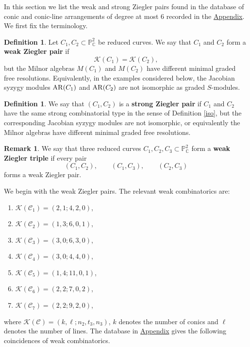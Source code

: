 \documentclass[11pt]{article}
\theoremstyle{plain}
\theoremstyle{definition}
\newtheorem{definition}[thm]{Definition}
\newtheorem{remark}[thm]{Remark}
\begin{document}
In this section we list the weak and strong Ziegler pairs found in the database of conic and conic-line arrangements of degree at most $6$ recorded in the \hyperref[sec:data]{Appendix}. We first fix the terminology.

\begin{definition}
Let $C_1,C_2\subset\mathbb P^2_{\mathbb C}$ be reduced curves. We say that $C_1$ and $C_2$ form a \textbf{weak Ziegler pair} if
\[
\mathcal K(C_1)=\mathcal K(C_2),
\]
but the Milnor algebras $M(C_1)$ and $M(C_2)$ have different minimal graded free resolutions. Equivalently, in the examples considered below, the Jacobian syzygy modules ${\rm AR}(C_1)$ and ${\rm AR}(C_2)$ are not isomorphic as graded $S$-modules.
\end{definition}

\begin{definition}
We say that \((C_1,C_2)\) is a \textbf{strong Ziegler pair} if \(C_1\) and
\(C_2\) have the same strong combinatorial type in the sense of
Definition \ref{iso}, but the corresponding Jacobian syzygy modules are not
isomorphic, or equivalently the Milnor algebras have different minimal
graded free resolutions.
\end{definition}

\begin{remark}
    We say that three reduced curves \(C_1,C_2, C_3\subset\mathbb P^2_{\mathbb{C}}\) form a {\bf weak Ziegler triple} if every pair \[(C_1,C_2), \qquad (C_1,C_3), \qquad (C_2,C_3)\] forms a weak Ziegler pair.
\end{remark}

We begin with the weak Ziegler pairs. The relevant weak combinatorics are:
\begin{enumerate}
    \item $\mathcal{K}(\mathcal{C}_1)=(2,1;4,2,0)$,
    \item $\mathcal{K}(\mathcal{C}_2)=(1,3;6,0,1)$,
    \item $\mathcal{K}(\mathcal{C}_3)=(3,0;6,3,0)$,
    \item $\mathcal{K}(\mathcal{C}_4)=(3,0;4,4,0)$,
    \item $\mathcal{K}(\mathcal{C}_5)=(1,4;11,0,1)$,
    \item $\mathcal{K}(\mathcal{C}_6)=(2,2;7,0,2)$,
    \item $\mathcal{K}(\mathcal{C}_7)=(2,2;9,2,0)$,
\end{enumerate}
where $\mathcal K(\mathcal C)=(k,\ell;n_2,t_3,n_3)$, $k$ denotes the number of conics and $\ell$ denotes the number of lines. The database in \hyperref[sec:data]{Appendix} gives the following coincidences of weak combinatorics.
\end{document}

